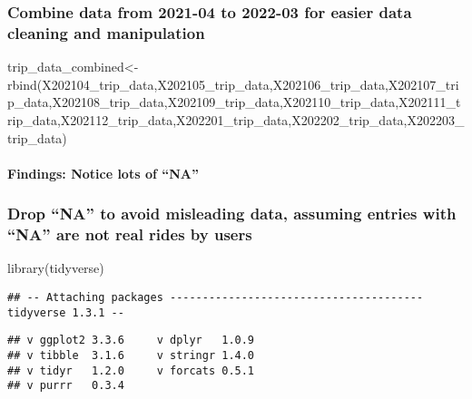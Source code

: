 \documentclass[
]{article}
\newenvironment{Shaded}{\begin{snugshade}}{\end{snugshade}}
\newcommand{\FunctionTok}[1]{\textcolor[rgb]{0.00,0.00,0.00}{#1}}
\newcommand{\NormalTok}[1]{#1}
\newcommand{\OtherTok}[1]{\textcolor[rgb]{0.56,0.35,0.01}{#1}}
\begin{document}
\hypertarget{combine-data-from-2021-04-to-2022-03-for-easier-data-cleaning-and-manipulation}{%
\subsubsection{Combine data from 2021-04 to 2022-03 for easier data
cleaning and
manipulation}\label{combine-data-from-2021-04-to-2022-03-for-easier-data-cleaning-and-manipulation}}

\begin{Shaded}
\begin{Highlighting}[]
\NormalTok{trip\_data\_combined}\OtherTok{\textless{}{-}}\FunctionTok{rbind}\NormalTok{(X202104\_trip\_data,X202105\_trip\_data,X202106\_trip\_data,X202107\_trip\_data,X202108\_trip\_data,X202109\_trip\_data,X202110\_trip\_data,X202111\_trip\_data,X202112\_trip\_data,X202201\_trip\_data,X202202\_trip\_data,X202203\_trip\_data)}
\end{Highlighting}
\end{Shaded}

\hypertarget{findings-notice-lots-of-na}{%
\paragraph{Findings: Notice lots of
``NA''}\label{findings-notice-lots-of-na}}

\hypertarget{drop-na-to-avoid-misleading-data-assuming-entries-with-na-are-not-real-rides-by-users}{%
\subsubsection{Drop ``NA'' to avoid misleading data, assuming entries
with ``NA'' are not real rides by
users}\label{drop-na-to-avoid-misleading-data-assuming-entries-with-na-are-not-real-rides-by-users}}

\begin{Shaded}
\begin{Highlighting}[]
\FunctionTok{library}\NormalTok{(tidyverse)}
\end{Highlighting}
\end{Shaded}

\begin{verbatim}
## -- Attaching packages --------------------------------------- tidyverse 1.3.1 --
\end{verbatim}

\begin{verbatim}
## v ggplot2 3.3.6     v dplyr   1.0.9
## v tibble  3.1.6     v stringr 1.4.0
## v tidyr   1.2.0     v forcats 0.5.1
## v purrr   0.3.4
\end{verbatim}
\end{document}

